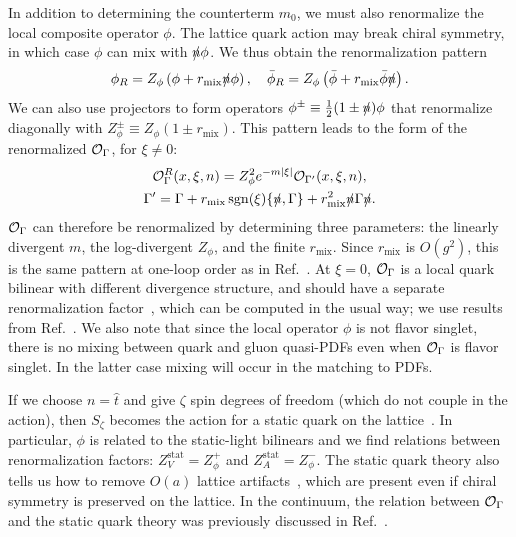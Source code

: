 In addition to determining the counterterm $m_0$, we must also
renormalize the local composite operator $\phi$. The lattice quark
action may break chiral symmetry, in which case $\phi$ can mix with
$\slashed{n}\phi$. We thus obtain the renormalization pattern
\begin{equation}
  \phi_R = Z_\phi\left(\phi+r_\text{mix}\slashed{n}\phi\right),\quad
  \bar\phi_R = Z_\phi\left(\bar\phi+r_\text{mix}\bar\phi\slashed{n}\right).
\end{equation}
We can also use projectors to form operators
$\phi^\pm\equiv\frac{1}{2}(1\pm\slashed{n})\phi$ that renormalize
diagonally with $Z_\phi^\pm\equiv Z_\phi(1\pm r_\text{mix})$. This pattern
leads to the form of the renormalized $\mathcal{O}_\Gamma$, for $\xi\neq 0$:
\begin{equation}
\begin{gathered}
  \mathcal{O}_\Gamma^R(x,\xi,n) = Z_\phi^2e^{-m|\xi|}\mathcal{O}_{\Gamma'}(x,\xi,n),\\
\Gamma' = \Gamma + r_\text{mix}\operatorname{sgn}(\xi)\{\slashed{n},\Gamma\} + r_\text{mix}^2\slashed{n}\Gamma\slashed{n}.
\end{gathered}
\end{equation}
$\mathcal{O}_\Gamma$ can therefore be renormalized by determining three
parameters: the linearly divergent $m$, the log-divergent $Z_\phi$,
and the finite $r_\text{mix}$. Since $r_\text{mix}$ is $O(g^2)$, this
is the same pattern at one-loop order as in
Ref.~\cite{Constantinou:2017sej}. At $\xi=0$, $\mathcal{O}_\Gamma$ is a local
quark bilinear with different divergence structure, and should have a
separate renormalization factor~\cite{Constantinou_privcomm}, which
can be computed in the usual way; we use results from
Ref.~\cite{Alexandrou:2015sea}. We also note that since the local
operator $\phi$ is not flavor singlet, there is no mixing between
quark and gluon quasi-PDFs even when $\mathcal{O}_\Gamma$ is flavor singlet.
In the latter case mixing will occur in the matching to PDFs.

If we choose $n=\hat t$ and give $\zeta$ spin degrees of freedom
(which do not couple in the action), then $S_\zeta$ becomes the action
for a static quark on the
lattice~\cite{Eichten:1989zv,Sommer:2010ic}. In particular, $\phi$ is
related to the static-light bilinears and we find relations between
renormalization factors: $Z_V^\text{stat}=Z_\phi^+$ and
$Z_A^\text{stat}=Z_\phi^-$. The static quark theory also tells us how
to remove $O(a)$ lattice artifacts~\cite{Kurth:2000ki}, which are
present even if chiral symmetry is preserved on the lattice. In the
continuum, the relation between $\mathcal{O}_\Gamma$ and the static quark
theory was previously discussed in Ref.~\cite{Ji:2015jwa}.

